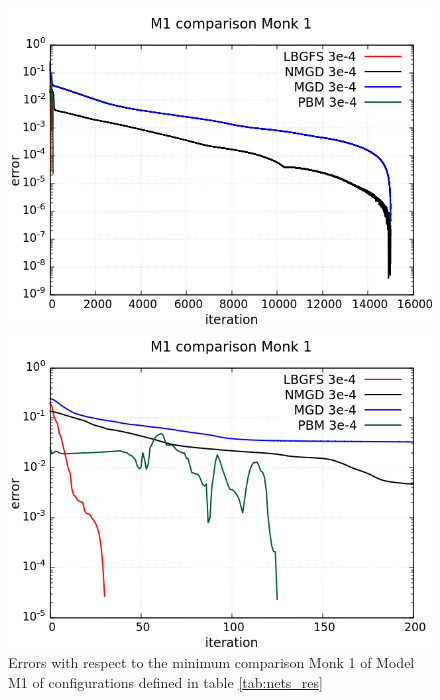 \begin{figure}[H]
	\centering
	\begin{minipage}[t]{0.5\linewidth}
		\includegraphics[width=\linewidth]{data/Comparison/Monk1/Monk1_M1_error_standard.png}
	\end{minipage}%
	\begin{minipage}[t]{0.5\linewidth}
		\includegraphics[width=\linewidth]{data/Comparison/Monk1/Monk1_M1_error_zoom.png}
	\end{minipage}
	\caption{Errors with respect to the minimum comparison Monk 1 of Model M1 of configurations defined in table \ref{tab:nets_res}}
	\label{R-Monk1-M1}
\end{figure}

